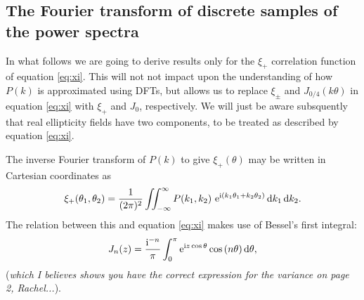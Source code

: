 \documentclass[preprint]{aastex}
\newcommand{\rmd}{\ensuremath{\mathrm{d}}}
\newcommand{\mi}{{\rm i}}
\newcommand{\me}{{\rm e}}
\begin{document}
\subsection{The Fourier transform of discrete samples of the power spectra}\label{sect:DFTPS}
In what follows we are going to derive results only for the $\xi_+$ correlation function of equation \eqref{eq:xi}.  This will not not impact upon the understanding of how $P(k)$ is approximated using DFTs, but allows us to replace $\xi_{\pm}$ and $J_{0/4}(k \theta)$ in equation \eqref{eq:xi} with $\xi_+$ and $J_0$, respectively.  We will just be aware subsquently that real ellipticity fields have two components, to be treated as described by equation \eqref{eq:xi}.

The inverse Fourier transform of $P(k)$ to give $\xi_+(\theta)$ may be written in Cartesian coordinates as
\begin{equation}
  \xi_{+}(\theta_1, \theta_2)  = \frac{1}{(2 \pi)^2} \int \! \! \!
  \int_{-\infty}^{\infty} P(k_1, k_2) ~ \me^{\mi (k_1 \theta_1 + k_2
  \theta_2)} \, \rmd k_1 \, \rmd k_2. \label{eq:xip}
\end{equation}
The relation between this and equation \eqref{eq:xi} makes use of Bessel's first
integral:
\begin{equation}
J_n(z) = \frac{\mi^{-n}}{\pi} \int_0^{\pi} \me^{\mi z \cos{\theta}}
\cos{(n \theta)} \, \rmd \theta,  
\end{equation}
(\emph{which I believes shows you have the correct expression for the
  variance on page 2, Rachel...}).
\end{document}
